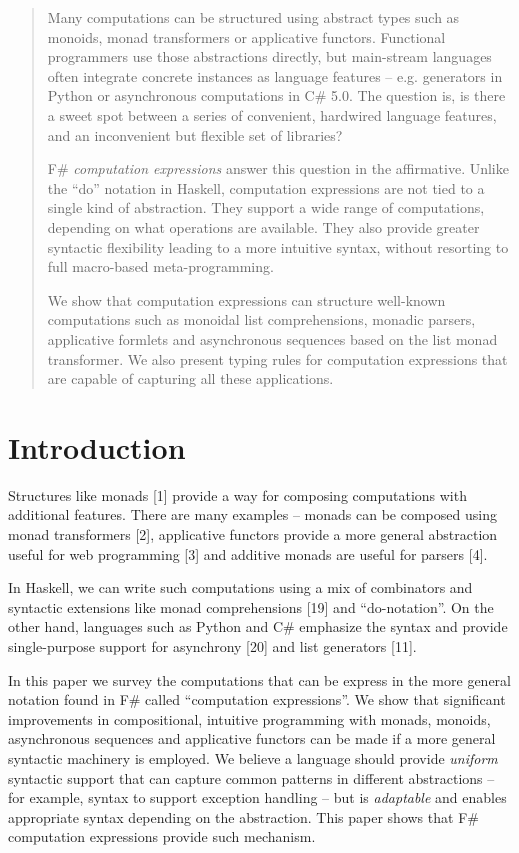\documentclass[runningheads,a4paper]{llncs}
\begin{document}
\begin{abstract}
Many computations can be structured using abstract types such as monoids, monad transformers or 
applicative functors. Functional programmers use those abstractions directly, but main-stream
languages often integrate concrete instances as language features -- e.g. generators in Python
or asynchronous computations in C\# 5.0. The question is, is there a sweet spot between a series of
convenient, hardwired language features, and an inconvenient but flexible set of libraries?

\quad F\# \emph{computation expressions} answer this question in the affirmative. Unlike 
the ``do'' notation in Haskell, computation expressions are not tied to a single kind of abstraction.
They support a wide range of computations, depending on what operations are available. They also 
provide greater syntactic flexibility leading to a more intuitive syntax, without resorting to 
full macro-based meta-programming. 

\quad We show that computation expressions can structure well-known computations such as monoidal 
list comprehensions, monadic parsers, applicative formlets and asynchronous sequences based on the 
list monad transformer. We also present typing rules for computation expressions that are capable of 
capturing all these applications. 

\end{abstract}


\section{Introduction}
Structures like monads [1] provide a way for composing computations with additional features. 
There are many examples -- monads can be composed using monad transformers [2], applicative
functors provide a more general abstraction useful for web programming [3] and additive monads
are useful for parsers [4].

In Haskell, we can write such computations using a mix of combinators and syntactic extensions like 
monad comprehensions [19] and ``do-notation''. On the other hand, languages such as Python and C\# 
emphasize the syntax and provide single-purpose support for asynchrony [20] and list generators [11]. 

In this paper we survey the computations that can be express in the more general notation found in F\# called
``computation expressions''.  We show that significant improvements in compositional, intuitive programming with monads, 
monoids, asynchronous sequences and applicative functors can be made if a more general syntactic machinery is employed.
We believe a language should provide \emph{uniform} syntactic support that 
can capture common patterns in different abstractions -- for example, syntax to support 
exception handling -- but is \emph{adaptable} and enables appropriate syntax depending
on the abstraction. This paper shows that F\# computation expressions provide such mechanism.
\end{document}
